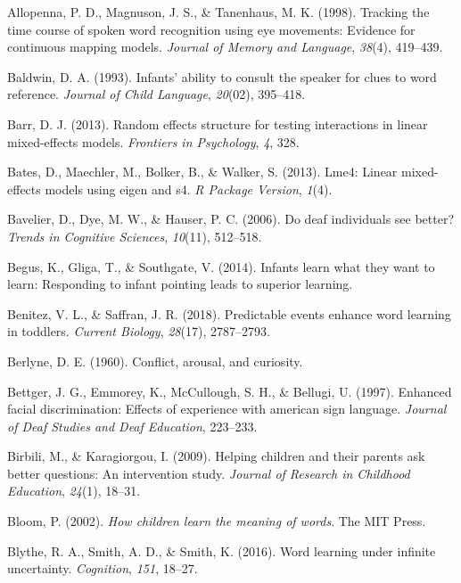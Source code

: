 \documentclass[oneside]{report}
\begin{document}
\hypertarget{ref-allopenna1998tracking}{}
Allopenna, P. D., Magnuson, J. S., \& Tanenhaus, M. K. (1998). Tracking
the time course of spoken word recognition using eye movements: Evidence
for continuous mapping models. \emph{Journal of Memory and Language},
\emph{38}(4), 419--439.

\hypertarget{ref-baldwin1993infants}{}
Baldwin, D. A. (1993). Infants' ability to consult the speaker for clues
to word reference. \emph{Journal of Child Language}, \emph{20}(02),
395--418.

\hypertarget{ref-barr2013random}{}
Barr, D. J. (2013). Random effects structure for testing interactions in
linear mixed-effects models. \emph{Frontiers in Psychology}, \emph{4},
328.

\hypertarget{ref-bates2013lme4}{}
Bates, D., Maechler, M., Bolker, B., \& Walker, S. (2013). Lme4: Linear
mixed-effects models using eigen and s4. \emph{R Package Version},
\emph{1}(4).

\hypertarget{ref-bavelier2006deaf}{}
Bavelier, D., Dye, M. W., \& Hauser, P. C. (2006). Do deaf individuals
see better? \emph{Trends in Cognitive Sciences}, \emph{10}(11),
512--518.

\hypertarget{ref-begus2014infants}{}
Begus, K., Gliga, T., \& Southgate, V. (2014). Infants learn what they
want to learn: Responding to infant pointing leads to superior learning.

\hypertarget{ref-benitez2018predictable}{}
Benitez, V. L., \& Saffran, J. R. (2018). Predictable events enhance
word learning in toddlers. \emph{Current Biology}, \emph{28}(17),
2787--2793.

\hypertarget{ref-berlyne1960conflict}{}
Berlyne, D. E. (1960). Conflict, arousal, and curiosity.

\hypertarget{ref-bettger1997enhanced}{}
Bettger, J. G., Emmorey, K., McCullough, S. H., \& Bellugi, U. (1997).
Enhanced facial discrimination: Effects of experience with american sign
language. \emph{Journal of Deaf Studies and Deaf Education}, 223--233.

\hypertarget{ref-birbili2009helping}{}
Birbili, M., \& Karagiorgou, I. (2009). Helping children and their
parents ask better questions: An intervention study. \emph{Journal of
Research in Childhood Education}, \emph{24}(1), 18--31.

\hypertarget{ref-bloom2002children}{}
Bloom, P. (2002). \emph{How children learn the meaning of words}. The
MIT Press.

\hypertarget{ref-blythe2016word}{}
Blythe, R. A., Smith, A. D., \& Smith, K. (2016). Word learning under
infinite uncertainty. \emph{Cognition}, \emph{151}, 18--27.
\end{document}
